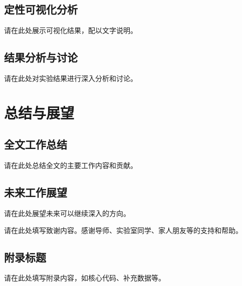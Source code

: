 \documentclass[supercite]{HustGraduPaper}
\begin{document}
	\subsection{定性可视化分析}
	
	请在此处展示可视化结果，配以文字说明。
	
	\subsection{结果分析与讨论}
	
	请在此处对实验结果进行深入分析和讨论。
	
	\section{总结与展望}
	
	\subsection{全文工作总结}
	
	请在此处总结全文的主要工作内容和贡献。
	
	\subsection{未来工作展望}
	
	请在此处展望未来可以继续深入的方向。
	
	\begin{thankpage}
		请在此处填写致谢内容。感谢导师、实验室同学、家人朋友等的支持和帮助。
	\end{thankpage}
	
	
	
	\begin{appendices}
		\section{附录标题}
		
		请在此处填写附录内容，如核心代码、补充数据等。
	\end{appendices}
	
\end{document}

